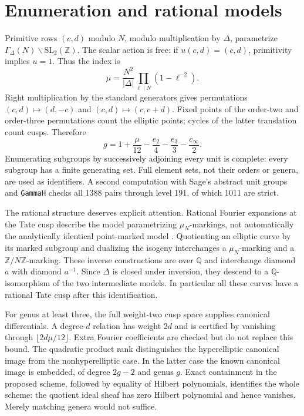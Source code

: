 \documentclass[11pt]{article}
\newcommand{\Q}{\mathbb Q}
\theoremstyle{remark}\newtheorem{remark}[theorem]{Remark}
\begin{document}
\section{Enumeration and rational models}
Primitive rows $(c,d)$ modulo $N$, modulo multiplication by $\Delta$,
parametrize $\Gamma_\Delta(N)\backslash\mathrm{SL}_2(\mathbb Z)$.
The scalar action is free: if $u(c,d)=(c,d)$, primitivity implies $u=1$.
Thus the index is
\[
 \mu=\frac{N^2}{|\Delta|}\prod_{\ell\mid N}(1-\ell^{-2}).
\]
Right multiplication by the standard generators gives permutations
$(c,d)\mapsto(d,-c)$ and $(c,d)\mapsto(c,c+d)$. Fixed points of the
order-two and order-three permutations count the elliptic points;
cycles of the latter translation count cusps. Therefore
\[
 g=1+\frac\mu{12}-\frac{e_2}4-\frac{e_3}3-\frac{c_\infty}2.
\]
Enumerating subgroups by successively adjoining every unit is complete:
every subgroup has a finite generating set. Full element sets, not their
orders or genera, are used as identifiers. A second computation with
Sage's abstract unit groups and \texttt{GammaH} checks all 1388 pairs
through level 191, of which 1011 are strict.

The rational structure deserves explicit attention. Rational Fourier
expansions at the Tate cusp describe the model parametrizing
$\mu_N$-markings, not automatically the analytically identical
point-marked model \cite[proof of Lemma 6.1.6]{CES}. Quotienting an elliptic curve by its marked subgroup
and dualizing the isogeny interchanges a $\mu_N$-marking and a
$\mathbb Z/N\mathbb Z$-marking. These inverse constructions are over
$\Q$ and interchange diamond $a$ with diamond $a^{-1}$. Since $\Delta$
is closed under inversion, they descend to a $\Q$-isomorphism of the
two intermediate models. In particular all these curves have a rational
Tate cusp after this identification.

For genus at least three, the full weight-two cusp space supplies
canonical differentials. A degree-$d$ relation has weight $2d$ and is
certified by vanishing through $\lfloor2d\mu/12\rfloor$. Extra Fourier
coefficients are checked but do not replace this bound. The quadratic
product rank distinguishes the hyperelliptic canonical image from the
nonhyperelliptic case. In the latter case the known canonical image is
embedded, of degree $2g-2$ and genus $g$. Exact containment in the proposed
scheme, followed by equality of Hilbert polynomials, identifies the whole
scheme: the quotient ideal sheaf has zero Hilbert polynomial and hence
vanishes. Merely matching genera would not suffice.
\end{document}
